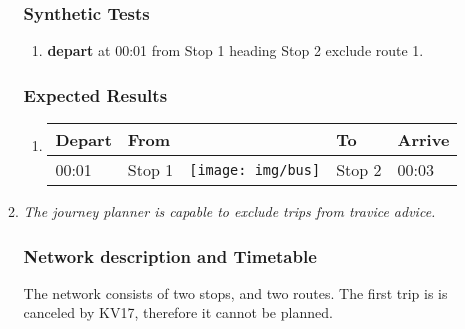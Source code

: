 \documentclass[a4paper,11pt]{article}
\newcommand*{\bus}{\texttt{[image: img/bus]}}
\begin{document}
\begin{enumerate}
\begin{enumerate}
\subsubsection*{Synthetic Tests}
\begin{enumerate}
\item \textbf{depart} at 00:01 from Stop 1 heading Stop 2 exclude route 1.
\end{enumerate}

\subsubsection*{Expected Results}
\begin{enumerate}
\item
{\scriptsize
\begin{tabular}{p{.75cm} | p{3.0cm} c p{3.0cm} | p{.75cm} }
\hline
\rowcolor{Gray}
Depart & From & \hspace{0.4cm} & To & Arrive \\
\hline
00:01 & Stop 1 & \bus & Stop 2 & 00:03 \\
\hline
\end{tabular}
}
\end{enumerate}
\vspace{2em}



\item \textit{The journey planner is capable to exclude trips from travice advice.}

\subsubsection*{Network description and Timetable}
The network consists of two stops, and two routes.
The first trip is is canceled by KV17, therefore it cannot be planned.

\begin{figure}[h]
\vspace{1em}
\raggedleft
\begin{minipage}{255pt}
\end{minipage}
\end{figure}
\end{enumerate}
\end{enumerate}
\end{document}
